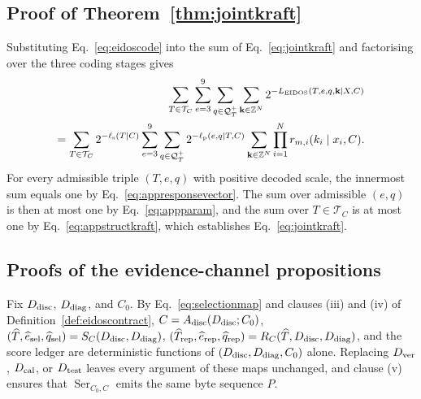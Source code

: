 \subsection{Proof of Theorem~\ref{thm:jointkraft}}\label{app:proofkraft}

\begin{pf}
Substituting Eq.~\eqref{eq:eidoscode} into the sum of Eq.~\eqref{eq:jointkraft} and factorising over the three coding stages gives
\begin{equation}\label{eq:appkraftfactor}
\begin{aligned}
\sum_{T\in\mathcal T_C}\sum_{e=3}^{9}\sum_{q\in\mathcal Q_T^+}\sum_{\mathbf k\in\mathbb Z^N}
2^{-L_{\mathrm{EIDOS}}(T,e,q,\mathbf k\mid X,C)}\\
=\sum_{T\in\mathcal T_C}2^{-\ell_{\rm s}(T\mid C)}
\sum_{e=3}^{9}\sum_{q\in\mathcal Q_T^+}2^{-\ell_{\rm p}(e,q\mid T,C)}
\sum_{\mathbf k\in\mathbb Z^N}\prod_{i=1}^{N}r_{m,i}(k_i\mid x_i,C).
\end{aligned}
\end{equation}
For every admissible triple \((T,e,q)\) with positive decoded scale, the innermost sum equals one by Eq.~\eqref{eq:appresponsevector}. The sum over admissible \((e,q)\) is then at most one by Eq.~\eqref{eq:appparam}, and the sum over \(T\in\mathcal T_C\) is at most one by Eq.~\eqref{eq:appstructkraft}, which establishes Eq.~\eqref{eq:jointkraft}.
\end{pf}

\subsection{Proofs of the evidence-channel propositions}\label{app:proofevidence}\label{app:proofreplacement}\label{app:proofdominance}\label{app:proofconformal}

\begin{pf}
Fix \(D_{\rm disc}\), \(D_{\rm diag}\), and \(C_0\). By Eq.~\eqref{eq:selectionmap} and clauses (iii) and (iv) of Definition~\ref{def:eidoscontract}, \(C=A_{\rm disc}(D_{\rm disc};C_0)\), \((\widehat T,\widehat e_{\rm sel},\widehat q_{\rm sel})=S_C(D_{\rm disc},D_{\rm diag})\), \((\widehat T_{\rm rep},\widehat e_{\rm rep},\widehat q_{\rm rep})=R_C(\widehat T,D_{\rm disc},D_{\rm diag})\), and the score ledger are deterministic functions of \((D_{\rm disc},D_{\rm diag},C_0)\) alone. Replacing \(D_{\rm ver}\), \(D_{\rm cal}\), or \(D_{\rm test}\) leaves every argument of these maps unchanged, and clause (v) ensures that \(\operatorname{Ser}_{C_0,C}\) emits the same byte sequence \(P\).
\end{pf}

